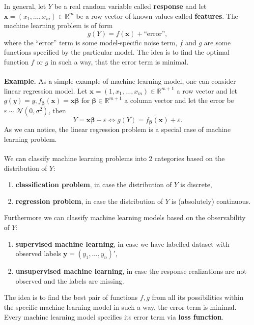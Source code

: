 \documentclass[12pt, a4paper]{report}
\newcommand{\R}{\mathbb{R}}
\theoremstyle{plain}
\theoremstyle{plain}
\theoremstyle{remark}
\begin{document}
In general, let $Y$ be a real random variable called \textbf{response} and let $\pmb{x}=(x_1,\ldots,x_m)\in \R^m$ be a row vector of known values called \textbf{features}. The machine learning problem is of form
$$
g(Y) = f(\pmb{x})+\text{``error''},
$$
where the ``error'' term is some model-specific noise term, $f$ and $g$ are some functions specified by the particular model. The idea is to find the optimal function $f$ or $g$ in such a way, that the error term is minimal.\\
\\
\textbf{Example.} As a simple example of machine learning model, one can consider linear regression model. Let $\pmb{x} = (1,x_1,\ldots,x_m)\in\R^{m+1}$ a row vector and let $g(y)=y, f_{\pmb{\beta}}(\pmb{x})=\pmb{x}\pmb{\beta}$ for $\pmb{\beta}\in\R^{m+1}$ a column vector and let the error be $\varepsilon\sim\mathcal{N}(0,\sigma^2)$, then
$$
Y = \pmb{x}\pmb{\beta} + \varepsilon \Leftrightarrow g(Y) = f_{\pmb{\beta}}(\pmb{x}) + \varepsilon.
$$
As we can notice, the linear regression problem is a special case of machine learning problem.\\
\\
We can classify machine learning problems into 2 categories based on the distribution of $Y$:

\begin{enumerate}
\item \textbf{classification problem}, in case the distribution of $Y$ is discrete,
\item \textbf{regression problem}, in case the distribution of $Y$ is (absolutely) continuous.
\end{enumerate}

Furthermore we can classify machine learning models based on the observability of $Y$:
\begin{enumerate}
\item \textbf{supervised machine learning}, in case we have labelled dataset with observed labels $\pmb{y}=(y_1,\ldots,y_n)'$,
\item \textbf{unsupervised machine learning}, in case the response realizations are not observed and the labels are missing.
\end{enumerate}

The idea is to find the best pair of functions $f,g$ from all its possibilities within the specific machine learning model in such a way, the error term is minimal. Every machine learning model specifies its error term via \textbf{loss function}.
\end{document}
